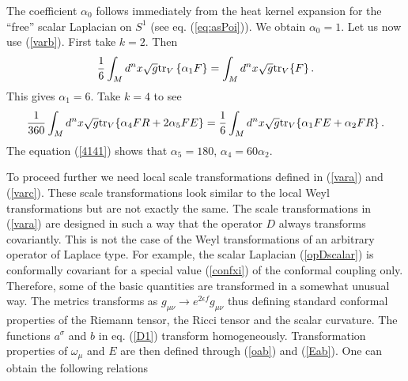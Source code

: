 The coefficient $\alpha_0$ follows immediately from the
heat kernel expansion for the ``free'' scalar Laplacian
on $S^1$ (see eq. (\ref{eq:asPoi})). We obtain
$\alpha_0=1$. Let us now use (\ref{varb}).
First take $k=2$. Then
\begin{equation}
\frac 16 \int_M d^nx\sqrt{g} {\rm tr}_V \left\{ \alpha_1 F \right\} =
\int_M d^nx\sqrt{g} {\rm tr}_V \{F\} \,. \label{4140}
\end{equation}
This gives $\alpha_1=6$. Take $k=4$ to see
\begin{equation}
\frac 1{360}\int_M d^nx\sqrt{g} {\rm tr}_V \{ \alpha_4 FR +2\alpha_5 FE \}
=\frac 16 \int_M d^nx\sqrt{g} {\rm tr}_V \{ \alpha_1 FE +\alpha_2 FR \}\,.
\label{4141}
\end{equation}
The equation (\ref{4141}) shows that $\alpha_5=180$,
$\alpha_4=60\alpha_2$. 

To proceed further we need local scale transformations defined in
(\ref{vara}) and (\ref{varc}). These scale transformations look
similar to the local Weyl transformations but are not exactly
the same. The scale transformations in (\ref{vara})
are designed in such a way that the operator $D$ always transforms
covariantly. This is not the case of the Weyl transformations of
an arbitrary operator of Laplace type. For example, the scalar Laplacian
(\ref{opDscalar}) is conformally covariant for a special value (\ref{confxi})
of the conformal coupling only.
Therefore, some of the basic quantities
are transformed in a somewhat unusual way. The metrics transforms
as $g_{\mu\nu}\to e^{2\epsilon f}g_{\mu\nu}$ thus defining standard
conformal properties of the Riemann tensor, the Ricci tensor and the
scalar curvature. The functions $a^\sigma$ and $b$ in eq. (\ref{D1})
transform homogeneously. Transformation properties of $\omega_\mu$
and $E$ are then defined through (\ref{oab}) and (\ref{Eab}).
One can obtain the following relations 
\cite{Gilkey1975,Gilkey:1995}
